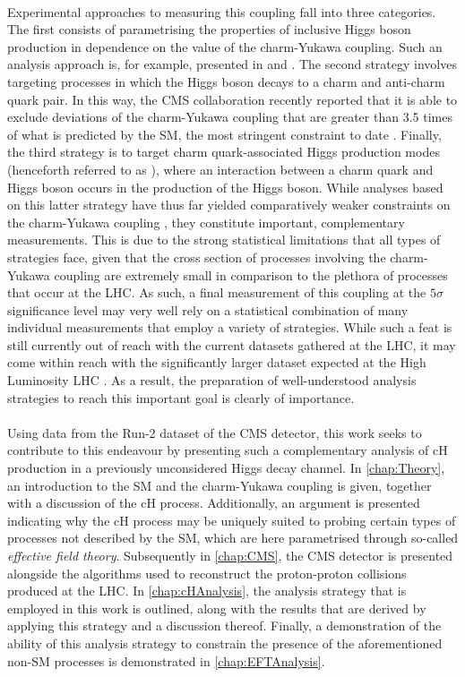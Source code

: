 \\
Experimental approaches to measuring this coupling fall into three categories. The first consists of parametrising the properties of inclusive Higgs boson production in dependence on the value of the charm-Yukawa coupling. Such an analysis approach is, for example, presented in \cite{gammaHProduction} and \cite{Bishara_2017}. The second strategy involves targeting processes in which the Higgs boson decays to a charm and anti-charm quark pair. In this way, the CMS collaboration recently reported that it is able to exclude deviations of the charm-Yukawa coupling that are greater than 3.5 times of what is predicted by the SM, the most stringent constraint to date \cite{cmscollaboration2025simultaneousprobecharmquark,}. Finally, the third strategy is to target charm quark-associated Higgs production modes (henceforth referred to as ), where an interaction between a charm quark and Higgs boson occurs in the production of the Higgs boson. While analyses based on this latter strategy have thus far yielded comparatively weaker constraints on the charm-Yukawa coupling \cite{cmscHgammgamma}\cite{cmscHWW}, they constitute important, complementary measurements. This is due to the strong statistical limitations that all types of strategies face, given that the cross section of processes involving the charm-Yukawa coupling are extremely small in comparison to the plethora of processes that occur at the LHC. As such, a final measurement of this coupling at the $5\sigma$ significance level may very well rely on a statistical combination of many individual measurements that employ a variety of strategies. While such a feat is still currently out of reach with the current datasets gathered at the LHC, it may come within reach with the significantly larger dataset expected at the High Luminosity LHC \cite{HL-LHC}. As a result, the preparation of well-understood analysis strategies to reach this important goal is clearly of importance. \\
\\
Using data from the Run-2 dataset of the CMS detector, this work seeks to contribute to this endeavour by presenting such a complementary analysis of cH production in a previously unconsidered Higgs decay channel. In \autoref{chap:Theory}, an introduction to the SM and the charm-Yukawa coupling is given, together with a discussion of the cH process. Additionally, an argument is presented indicating why the cH process may be uniquely suited to probing certain types of processes not described by the SM, which are here parametrised through so-called \textit{effective field theory}. Subsequently in \autoref{chap:CMS}, the CMS detector is presented alongside the algorithms used to reconstruct the proton-proton collisions produced at the LHC. In \autoref{chap:cHAnalysis}, the analysis strategy that is employed in this work is outlined, along with the results that are derived by applying this strategy and a discussion thereof. Finally, a demonstration of the ability of this analysis strategy to constrain the presence of the aforementioned non-SM processes is demonstrated in \autoref{chap:EFTAnalysis}.

